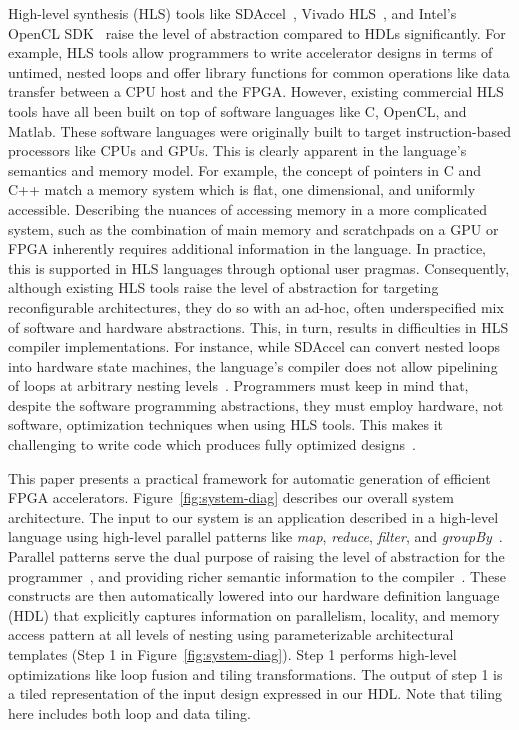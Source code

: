 High-level synthesis (HLS) tools like SDAccel~\cite{sdaccel}, Vivado HLS~\cite{vivadohls},
and Intel's OpenCL SDK~\cite{opencl_sdk} raise the level of abstraction compared to HDLs significantly.
For example, HLS tools allow programmers to write accelerator designs in terms of untimed, nested loops
and offer library functions for common operations like data transfer between a CPU host and the FPGA.
However, existing commercial HLS tools have all been built on top of software languages like C, OpenCL, and Matlab.
These software languages were originally built to target instruction-based processors like CPUs and GPUs.
This is clearly apparent in the language's semantics and memory model.
For example, the concept of pointers in C and C++ match a memory system which is flat, one dimensional, and uniformly accessible.
Describing the nuances of accessing memory in a more complicated system, such as the combination of main memory and
scratchpads on a GPU or FPGA inherently requires additional information in the language.
In practice, this is supported in HLS languages through optional user pragmas.
Consequently, although existing HLS tools raise the level of abstraction for targeting reconfigurable architectures,
they do so with an ad-hoc, often underspecified mix of software and hardware abstractions.
This, in turn, results in difficulties in HLS compiler implementations.
For instance, while SDAccel can convert nested loops into hardware state machines,
the language's compiler does not allow pipelining of loops at arbitrary nesting levels~\cite{vivado_userguide}.
Programmers must keep in mind that, despite the software programming abstractions, they must employ hardware, not software, optimization techniques when using HLS tools.
This makes it challenging to write code which produces fully optimized designs~\cite{nane2016survey}.



This paper presents a practical framework for automatic generation of
efficient FPGA accelerators. Figure~\ref{fig:system-diag} describes
our overall system architecture. The input to our system is an
application described in a high-level language using high-level
parallel patterns like \emph{map}, \emph{reduce},
\emph{filter}, and \emph{groupBy}~\cite{optiml}.
Parallel patterns serve the dual purpose of raising the
level of abstraction for the
programmer~\cite{ecoop13sujeeth,pldi13halide}, and providing richer
semantic information to the compiler~\cite{delite-tecs14}. These
constructs are then automatically lowered into our hardware definition
language (HDL) that explicitly captures information on parallelism,
locality, and memory access pattern at all levels of nesting using
parameterizable architectural templates (Step 1 in
Figure~\ref{fig:system-diag}). Step 1 performs high-level
optimizations like loop fusion and tiling transformations. The output
of step 1 is a tiled representation of the input design expressed in
our HDL. Note that tiling here includes both loop and data tiling.

